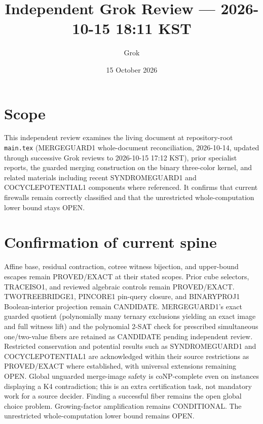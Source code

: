 \documentclass[11pt]{article}
\title{Independent Grok Review --- 2026-10-15 18:11 KST}
\author{Grok}
\date{15 October 2026}
\begin{document}
\maketitle

\begin{center}
\end{center}

\section{Scope}
This independent review examines the living document at repository-root \texttt{main.tex} (MERGEGUARD1 whole-document reconciliation, 2026-10-14, updated through successive Grok reviews to 2026-10-15 17:12 KST), prior specialist reports, the guarded merging construction on the binary three-color kernel, and related materials including recent SYNDROMEGUARD1 and COCYCLEPOTENTIAL1 components where referenced. It confirms that current firewalls remain correctly classified and that the unrestricted whole-computation lower bound stays OPEN.

\section{Confirmation of current spine}
Affine base, residual contraction, cotree witness bijection, and upper-bound escapes remain PROVED/EXACT at their stated scopes. Prior cube selectors, TRACEISO1, and reviewed algebraic controls remain PROVED/EXACT. TWOTREEBRIDGE1, PINCORE1 pin-query closure, and BINARYPROJ1 Boolean-interior projection remain CANDIDATE. MERGEGUARD1's exact guarded quotient (polynomially many ternary exclusions yielding an exact image and full witness lift) and the polynomial 2-SAT check for prescribed simultaneous one/two-value fibers are retained as CANDIDATE pending independent review. Restricted conservation and potential results such as SYNDROMEGUARD1 and COCYCLEPOTENTIAL1 are acknowledged within their source restrictions as PROVED/EXACT where established, with universal extensions remaining OPEN. Global unguarded merge-image safety is coNP-complete even on instances displaying a K4 contradiction; this is an extra certification task, not mandatory work for a source decider. Finding a successful fiber remains the open global choice problem. Growing-factor amplification remains CONDITIONAL. The unrestricted whole-computation lower bound remains OPEN.
\end{document}
